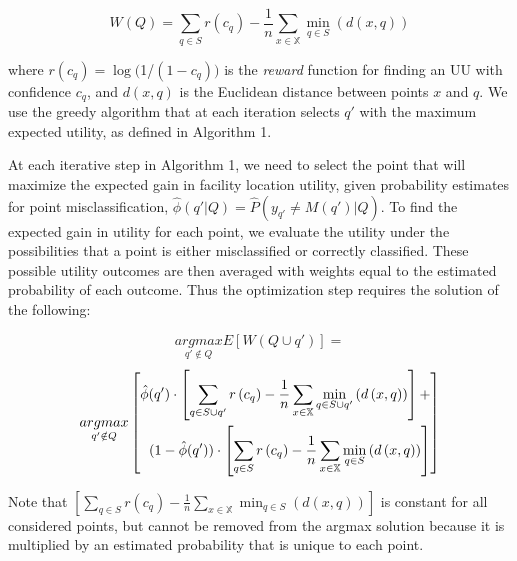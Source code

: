 \documentclass[10pt, conference]{IEEEtran}
\begin{document}
$$W(Q) = \sum_{q \in S} r \left(c_q\right) - \frac{1}{n} \sum_{x \in \mathbb{X}} \min_{q \in S}\left(d\left(x,q\right)\right)$$

where $r\left(c_q\right) = \log($1/$(1-c_q))$ is the \textit{reward} function for finding an UU with confidence $c_{q}$, and $d(x,q)$ is the Euclidean distance between points $x$ and $q$. We use the greedy algorithm that at each iteration selects $q'$ with the maximum expected utility, as defined in Algorithm 1. 

At each iterative step in Algorithm 1, we need to select the point that will maximize the expected gain in facility location utility, given probability estimates for point misclassification, $\hat{\phi}(q' | Q) = \hat{P}(y_{q'} \ne M(q' ) |  Q )$. To find the expected gain in utility for each point, we evaluate the utility under the possibilities that a point is either misclassified or correctly classified. These possible utility outcomes are then averaged with weights equal to the estimated probability of each outcome. Thus the optimization step requires the solution of the following:

$$\underset{q' \notin Q}{argmax} E[W(Q \cup q')] = $$
\begin{equation*}
\small
\underset{q' \notin Q}{argmax} \left[\begin{split}
\hat{\phi}(q') \cdot \left[\sum_{q \in S \cup q'} r \left(c_q\right) - \frac{1}{n} \sum_{x \in \mathbb{X}} \min_{q \in S \cup q'}\left(d\left(x,q\right)\right) \right] + \\ 
(1-\hat{\phi}(q')) \cdot \left[\sum_{q \in S} r \left(c_q\right) - \frac{1}{n} \sum_{x \in \mathbb{X}} \min_{q \in S}\left(d\left(x,q\right)\right)\right]  
\end{split}\right]
\end{equation*}
\normalsize

Note that $\left[\sum_{q \in S} r \left(c_q\right) - \frac{1}{n} \sum_{x \in \mathbb{X}} \min_{q \in S}\left(d\left(x,q\right)\right)\right]$ is constant for all considered points, but cannot be removed from the argmax solution because it is multiplied by an estimated probability that is unique to each point. 
\end{document}
